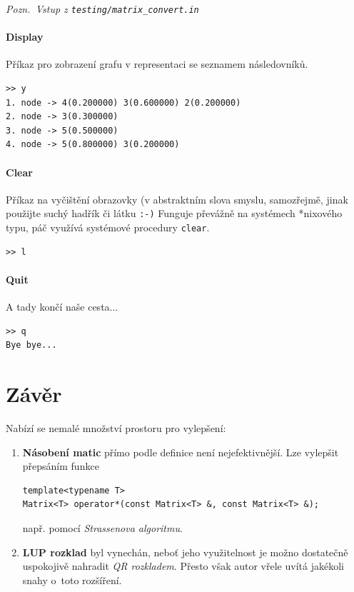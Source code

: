 \documentclass[11pt,a4paper]{article}
\begin{document}
{\noindent \sl Pozn.~Vstup z \tt testing/matrix\_convert.in}

\subsection{Display}
Příkaz pro zobrazení grafu v representaci se seznamem následovníků.



\begin{verbatim}
>> y
1. node -> 4(0.200000) 3(0.600000) 2(0.200000)
2. node -> 3(0.300000)
3. node -> 5(0.500000)
4. node -> 5(0.800000) 3(0.200000)
\end{verbatim}

\subsection{Clear}
Příkaz na vyčištění obrazovky (v abstraktním slova smyslu, samozřejmě, jinak
použijte suchý hadřík či látku {\tt :-)}
Funguje převážně na systémech *nixového typu, páč využívá systémové procedury
\verb=clear=.

\begin{verbatim}
>> l
\end{verbatim}

\subsection{Quit}
A tady končí naše cesta...

\begin{verbatim}
>> q
Bye bye...
\end{verbatim}

\pagebreak

\part{Závěr}

Nabízí se nemalé množství prostoru pro vylepšení:
\begin{enumerate}
  \item {\bf Násobení matic\/} přímo podle definice není nejefektivnější.
    Lze vylepšit přepsáním funkce
\begin{verbatim}template<typename T>
Matrix<T> operator*(const Matrix<T> &, const Matrix<T> &);\end{verbatim}
    např. pomocí \emph{Strassenova algoritmu\/}.
  \item {\bf LUP rozklad\/} byl vynechán, neboť jeho využitelnost je možno
    do\-sta\-teč\-ně uspokojivě nahradit \emph{QR rozkladem\/}.
    Přesto však autor vřele uvítá jakékoli snahy o~toto rozšíření.
\end{enumerate}
\end{document}
